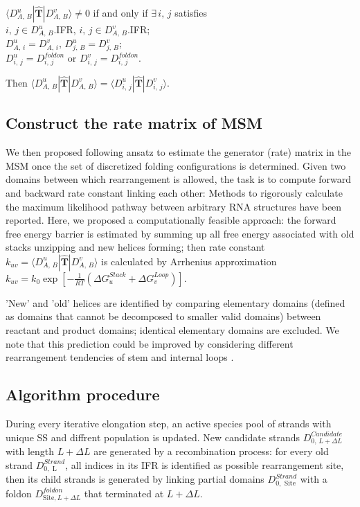 \documentclass[11pt, a4paper]{article}
\begin{document}
\begin{center}
  $\langle D^{u}_{A,\,B} | \hat{\mathbf{T}} | D^{v}_{A,\,B} \rangle \neq 0$ if and only if $\exists\, i,\,j$ satisfies\\
  $i,\,j \in D^{u}_{A,\,B}$.IFR, $i,\,j \in D^{v}_{A,\,B}$.IFR;\\
  $D^{u}_{A,\,i} = D^{v}_{A,\,i},\, D^{u}_{j,\,B} = D^{v}_{j,\,B}$;\\
  $D^{u}_{i,\,j} = D^{foldon}_{i,\,j}$ or $D^{v}_{i,\,j} = D^{foldon}_{i,\,j}$.\\
  \end{center}
  Then $\langle D^{u}_{A,\,B} | \hat{\mathbf{T}} | D^{v}_{A,\,B} \rangle = \langle D^{u}_{i,\,j} | \hat{\mathbf{T}} | D^{v}_{i,\,j} \rangle$.


\subsection{Construct the rate matrix of MSM} \label{section:rate}

We then proposed following ansatz to estimate the generator (rate) matrix in the MSM once the set of discretized folding configurations is determined. Given two domains between which rearrangement is allowed, the task is to compute forward and backward rate constant linking each other: Methods to rigorously calculate the maximum likelihood pathway between arbitrary RNA structures have been reported\cite{Bayegan}. Here, we proposed a computationally feasible approach: the forward free energy barrier is estimated by summing up all free energy associated with old stacks unzipping and new helices forming; then rate constant $k_{uv} = \langle D^{u}_{A,\,B} | \hat{\mathbf{T}} | D^{v}_{A,\,B} \rangle $ is calculated by Arrhenius approximation $k_{uv} = k_0 \exp[-\frac{1}{RT}(\Delta G^{Stack}_{u}+\Delta G^{Loop}_{v})]$.

'New' and 'old' helices are identified by comparing elementary domains (defined as domains that cannot be decomposed to smaller valid domains) between reactant and product domains; identical elementary domains are excluded. We note that this prediction could be improved
 by considering different rearrangement tendencies of stem and internal loops \cite{Sun2018}.

\subsection{Algorithm procedure}

During every iterative elongation step, an active species pool of strands with unique SS and diffrent population is updated. New candidate strands $D^{Candidate}_{0,\, L+\Delta L}$ with
length $L+\Delta L$ are generated by a recombination
process: for every old strand $D^{Strand}_{0, \text{ L}}$, all indices in its IFR is identified as possible rearrangement site, then its child strands is generated by linking partial domains
$D^{Strand}_{0, \text{ Site}}$ with a foldon $D^{foldon}_{\text{Site}, L+\Delta L}$ that terminated at $L+\Delta L$.
\end{document}
